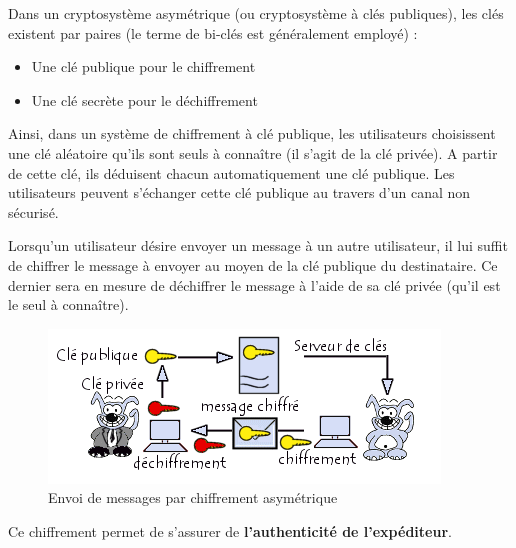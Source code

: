 \documentclass[conference]{IEEEtran}
\begin{document}
Dans un cryptosystème asymétrique (ou cryptosystème à clés publiques), les clés existent par paires (le terme de bi-clés est généralement employé) :
\begin{itemize}
    \item Une clé publique pour le chiffrement
     \item Une clé secrète pour le déchiffrement
\end{itemize}
    
Ainsi, dans un système de chiffrement à clé publique, les utilisateurs choisissent une clé aléatoire qu'ils sont seuls à connaître (il s'agit de la clé privée). A partir de cette clé, ils déduisent chacun automatiquement une clé publique. Les utilisateurs peuvent s'échanger cette clé publique au travers d'un canal non sécurisé.

Lorsqu'un utilisateur désire envoyer un message à un autre utilisateur, il lui suffit de chiffrer le message à envoyer au moyen de la clé publique du destinataire. Ce dernier sera en mesure de déchiffrer le message à l'aide de sa clé privée (qu'il est le seul à connaître). \cite{ccmasym}
\begin{subfigure}
    \centering
    \includegraphics[scale=0.7]{asym.PNG}
    \caption{Envoi de messages par chiffrement asymétrique}
    \label{fig:asym}
\end{subfigure}

\vspace{0.3cm}
Ce chiffrement permet de s'assurer de \textbf{l'authenticité de l'expéditeur}. \cite{wikiasym}\\
\end{document}
